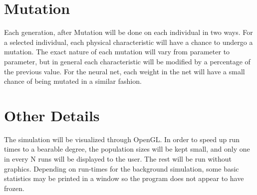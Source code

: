 \documentclass[paper=a4, fontsize=11pt]{scrartcl} %
\numberwithin{equation}{section} %
\numberwithin{figure}{section} %
\numberwithin{table}{section} %
\begin{document}
\section*{Mutation}

Each generation, after Mutation will be done on each individual in two ways. For a selected individual, each physical characteristic will have a chance to undergo a mutation. The exact nature of each mutation will vary from parameter to parameter, but in general each characteristic will be modified by a percentage of the previous value. For the neural net, each weight in the net will have a small chance of being mutated in a similar fashion.

\section*{Other Details}

The simulation will be visualized through OpenGL. In order to speed up run times to a bearable degree, the population sizes will be kept small, and only one in every N runs will be displayed to the user. The rest will be run without graphics. Depending on run-times for the background simulation, some basic statistics may be printed in a window so the program does not appear to have frozen.






\end{document}

